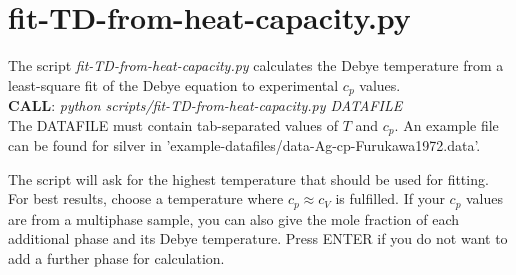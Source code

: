 %
\section{fit-TD-from-heat-capacity.py}
The script \emph{fit-TD-from-heat-capacity.py} calculates the Debye temperature from a least-square fit of the Debye equation to experimental $c_p$ values.\\

\textbf{CALL}: \emph{python scripts/fit-TD-from-heat-capacity.py DATAFILE}\\

The DATAFILE must contain tab-separated values of $T$ and $c_p$. An example file can be found for silver in 'example-datafiles/data-Ag-cp-Furukawa1972.data'.

The script will ask for the highest temperature that should be used for fitting. For best results, choose a temperature where $c_p\approx c_V$ is fulfilled. If your $c_p$ values are from a multiphase sample, you can also give the mole fraction of each additional phase and its Debye temperature. Press ENTER if you do not want to add a further phase for calculation.
